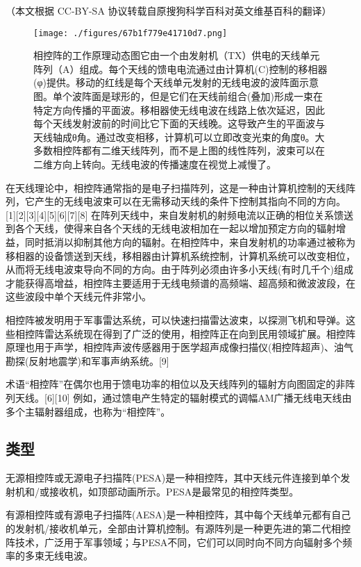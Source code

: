 
（本文根据 CC-BY-SA 协议转载自原搜狗科学百科对英文维基百科的翻译）

\begin{figure}[ht]
\centering
\texttt{[image: ./figures/67b1f779e41710d7.png]}
\caption{相控阵的工作原理动态图它由一个由发射机（TX）供电的天线单元阵列（A）组成。每个天线的馈电电流通过由计算机(C)控制的移相器(φ)提供。移动的红线是每个天线单元发射的无线电波的波阵面示意图。单个波阵面是球形的，但是它们在天线前组合(叠加)形成一束在特定方向传播的平面波。移相器使无线电波在线路上依次延迟，因此每个天线发射波前的时间比它下面的天线晚。这导致产生的平面波与天线轴成θ角。通过改变相移，计算机可以立即改变光束的角度θ。大多数相控阵都有二维天线阵列，而不是上图的线性阵列，波束可以在二维方向上转向。无线电波的传播速度在视觉上减慢了。} \label{fig_XKZ_1}
\end{figure}

在天线理论中，相控阵通常指的是电子扫描阵列，这是一种由计算机控制的天线阵列，它产生的无线电波束可以在无需移动天线的条件下控制其指向不同的方向。[1][2][3][4][5][6][7][8] 在阵列天线中，来自发射机的射频电流以正确的相位关系馈送到各个天线，使得来自各个天线的无线电波相加在一起以增加预定方向的辐射增益，同时抵消以抑制其他方向的辐射。在相控阵中，来自发射机的功率通过被称为移相器的设备馈送到天线，移相器由计算机系统控制，计算机系统可以改变相位，从而将无线电波束导向不同的方向。由于阵列必须由许多小天线(有时几千个)组成才能获得高增益，相控阵主要适用于无线电频谱的高频端、超高频和微波波段，在这些波段中单个天线元件非常小。

相控阵被发明用于军事雷达系统，可以快速扫描雷达波束，以探测飞机和导弹。这些相控阵雷达系统现在得到了广泛的使用，相控阵正在向到民用领域扩展。相控阵原理也用于声学，相控阵声波传感器用于医学超声成像扫描仪(相控阵超声)、油气勘探(反射地震学)和军事声纳系统。[9]

术语“相控阵”在偶尔也用于馈电功率的相位以及天线阵列的辐射方向图固定的非阵列天线。[6][10] 例如，通过馈电产生特定的辐射模式的调幅AM广播无线电天线由多个主辐射器组成，也称为“相控阵”。

\subsection{类型}
无源相控阵或无源电子扫描阵(PESA)是一种相控阵，其中天线元件连接到单个发射机和/或接收机，如顶部动画所示。PESA是最常见的相控阵类型。

有源相控阵或有源电子扫描阵(AESA)是一种相控阵，其中每个天线单元都有自己的发射机/接收机单元，全部由计算机控制。有源阵列是一种更先进的第二代相控阵技术，广泛用于军事领域；与PESA不同，它们可以同时向不同方向辐射多个频率的多束无线电波。

